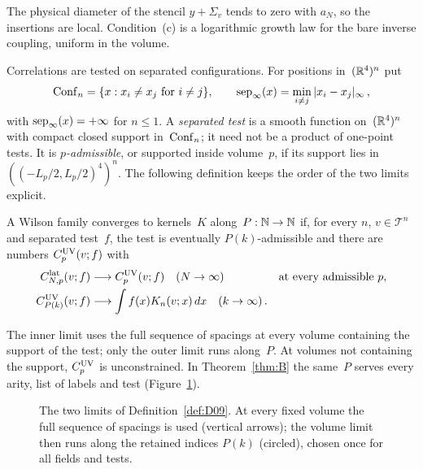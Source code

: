 The physical diameter of the stencil $y+\Sigma_v$ tends to zero with $a_N$, so the insertions are local. Condition~(c) is a logarithmic growth law for the bare inverse coupling, uniform in the volume.

Correlations are tested on separated configurations. For positions in~$(\mathbb{R}^4)^n$ put
\begin{equation*}
\mathrm{Conf}_{n}=\{x:x_i\ne x_j\text{ for }i\ne j\},\qquad
\operatorname{sep}_{\infty}(x)=\min_{i\ne j}|x_i-x_j|_\infty\,,
\end{equation*}
with $\operatorname{sep}_{\infty}(x)=+\infty$ for $n\le1$. A \emph{separated test} is a smooth function on~$(\mathbb{R}^4)^n$ with compact closed support in~$\mathrm{Conf}_{n}$; it need not be a product of one-point tests. It is \emph{$p$-admissible}, or supported inside volume~$p$, if its support lies in~$((-L_p/2,L_p/2)^4)^n$. The following definition keeps the order of the two limits explicit.

\begin{definition}\label{def:D09}
A Wilson family converges to kernels~$K$ along~$P:\mathbb{N}\to\mathbb{N}$ if, for every $n$, $v\in\mathcal T^n$ and separated test~$f$, the test is eventually $P(k)$-admissible and there are numbers $C_p^{\rm UV}(v;f)$ with
\begin{align*}
C^{\mathrm{lat}}_{N,p}(v;f)&\longrightarrow C_p^{\rm UV}(v;f)\quad(N\to\infty)
&&\text{at every admissible }p,\\
C_{P(k)}^{\rm UV}(v;f)&\longrightarrow\int f(x)K_n(v;x)\,dx\quad(k\to\infty)\,.
\end{align*}
\end{definition}

The inner limit uses the full sequence of spacings at every volume containing the support of the test; only the outer limit runs along~$P$. At volumes not containing the support, $C_p^{\rm UV}$ is unconstrained. In Theorem~\ref{thm:B} the same~$P$ serves every arity, list of labels and test (Figure~\ref{fig:two-limits}).

\begin{figure}[ht]
\centering
{}
\caption{The two limits of Definition~\ref{def:D09}. At every fixed volume the full sequence of spacings is used (vertical arrows); the volume limit then runs along the retained indices $P(k)$ (circled), chosen once for all fields and tests.}\label{fig:two-limits}
\end{figure}

